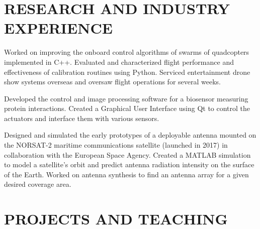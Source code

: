 \documentclass{ResumeTemplate}
\begin{document}
    \section{RESEARCH AND INDUSTRY EXPERIENCE}
    

    \workitemsthree
    {Worked on improving the onboard control algorithms of swarms of quadcopters implemented in C++.}
    {Evaluated and characterized flight performance and effectiveness of calibration routines using Python.}
    {Serviced entertainment drone show systems overseas and oversaw flight operations for several weeks.}
    
    
    \workitemstwo
    {Developed the control and image processing software for a biosensor measuring protein interactions.}
    {Created a Graphical User Interface using Qt to control the actuators and interface them with various sensors.}
    

    \workitemstwo
    {Designed and simulated the early prototypes of a deployable antenna mounted on the NORSAT-2 maritime communications satellite (launched in 2017) in collaboration with the European Space Agency.}
    {Created a MATLAB simulation to model a satellite's orbit and predict antenna radiation intensity on the surface of the Earth. Worked on antenna synthesis to find an antenna array for a given desired coverage area.}
    
    \section{PROJECTS AND TEACHING}
    
\end{document}
